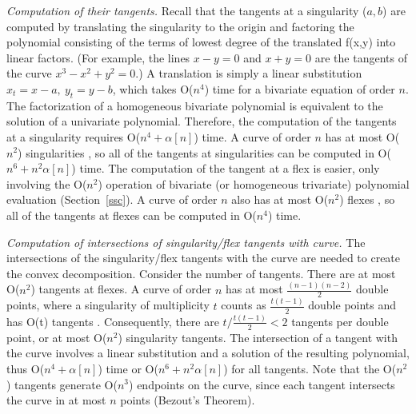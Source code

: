 {\em Computation of their tangents.} 
%
Recall that the tangents at a singularity ($a, b$) are computed by 
translating the singularity to the origin and factoring the polynomial consisting of 
the terms of lowest degree of the translated f(x,y) into linear factors.
(For example, the lines $x-y=0$ and $x+y=0$ are the tangents of the curve
$x^{3} - x^{2} + y^{2} = 0$.)
A translation is simply a linear substitution $x_{t} = x - a ,\ y_{t} = y - b$,
which takes O($n^{4}$) time for a bivariate equation of order $n$.
The factorization of a homogeneous bivariate polynomial is equivalent to the
solution of a univariate polynomial.
Therefore, the computation of the tangents at a singularity requires
O($n^{4} + \alpha[n]$) time.
A curve of order $n$ has at most O($n^2$) singularities \cite{walker},
so all of the tangents at singularities can be computed in O($n^{6} + n^{2}\alpha[n]$)
time.
The computation of the tangent at a flex is easier, only involving the O($n^{2}$)
operation of bivariate (or homogeneous trivariate) polynomial evaluation 
(Section~\ref{ssc}).
A curve of order $n$ also has at most O($n^{2}$) flexes \cite{walker},
so all of the tangents at flexes can be computed in O($n^{4}$) time.

{\em Computation of intersections of singularity/flex tangents with curve.}
%
The intersections of the singularity/flex tangents with the curve are needed to
create the convex decomposition.
Consider the number of tangents.
There are at most O($n^{2}$) tangents at flexes.
A curve of order $n$ has at most $\frac{(n-1)(n-2)}{2}$ double points, where
a singularity of multiplicity $t$ counts as $\frac{t(t-1)}{2}$ double points 
and has O(t) tangents \cite{walker}.
Consequently, there are $t / \frac{t(t-1)}{2} < 2$ tangents per double point,
or at most O($n^{2}$) singularity tangents.
The intersection of a tangent with the curve involves a linear substitution
and a solution of the resulting polynomial, thus O($n^{4} + \alpha[n]$) time or
O($n^{6} + n^{2}\alpha[n]$) for all tangents.
Note that the O($n^{2}$) tangents generate O($n^{3}$) endpoints on the curve, since
each tangent intersects the curve in at most $n$ points (Bezout's Theorem).

